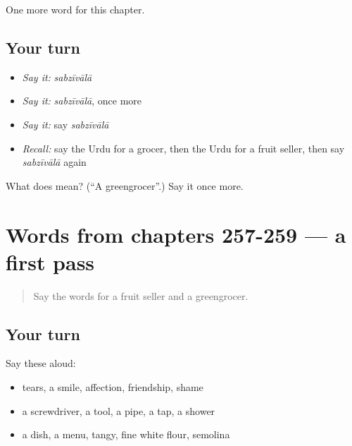 \begin{grammarlens}[title={What you've built}]
One more word for this chapter.
\end{grammarlens}

\subsection*{Your turn}
\begin{itemize}
\raggedright
  \item \emph{Say it:} \emph{sabzīvālā}
  \item \emph{Say it:} \emph{sabzīvālā}, once more
  \item \emph{Say it:} say \emph{sabzīvālā}
  \item \emph{Recall:} say the Urdu for a grocer, then the Urdu for a fruit seller, then say \emph{sabzīvālā} again
\end{itemize}

\begin{tcolorbox}[breakable,colback=teal!4,colframe=teal!35!black,title={Before you move on}]
What does   mean? (\textquotedblleft{}A greengrocer\textquotedblright{}.) Say it once more.
\end{tcolorbox}
\section[(dialogue)]{Words from chapters 257-259 — a first pass}

\label{lesson:UR-R263-first-pass-words-from-chapters-257-259}



\begin{quote}
Say the words for a fruit seller and a greengrocer.
\end{quote}

\subsection*{Your turn}
Say these aloud:

\begin{itemize}
\raggedright
  \item tears, a smile, affection, friendship, shame
  \item a screwdriver, a tool, a pipe, a tap, a shower
  \item a dish, a menu, tangy, fine white flour, semolina
\end{itemize}

